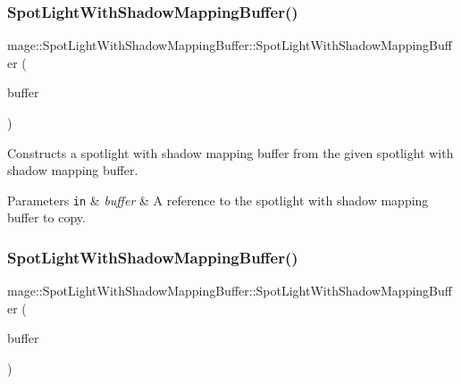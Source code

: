 \subsubsection{\texorpdfstring{Spot\+Light\+With\+Shadow\+Mapping\+Buffer()}{SpotLightWithShadowMappingBuffer()}\hspace{0.1cm}{\footnotesize\ttfamily [2/3]}}
{\footnotesize\ttfamily mage\+::\+Spot\+Light\+With\+Shadow\+Mapping\+Buffer\+::\+Spot\+Light\+With\+Shadow\+Mapping\+Buffer (\begin{DoxyParamCaption}\item[{const \hyperlink{structmage_1_1_spot_light_with_shadow_mapping_buffer}{Spot\+Light\+With\+Shadow\+Mapping\+Buffer} \&}]{buffer }\end{DoxyParamCaption})\hspace{0.3cm}{\ttfamily [default]}}

Constructs a spotlight with shadow mapping buffer from the given spotlight with shadow mapping buffer.


\begin{DoxyParams}[1]{Parameters}
\mbox{\tt in}  & {\em buffer} & A reference to the spotlight with shadow mapping buffer to copy. \\
\hline
\end{DoxyParams}
\hypertarget{structmage_1_1_spot_light_with_shadow_mapping_buffer_a933982cf023e052a21da2009f48d9ae1}{}\label{structmage_1_1_spot_light_with_shadow_mapping_buffer_a933982cf023e052a21da2009f48d9ae1} 
\subsubsection{\texorpdfstring{Spot\+Light\+With\+Shadow\+Mapping\+Buffer()}{SpotLightWithShadowMappingBuffer()}\hspace{0.1cm}{\footnotesize\ttfamily [3/3]}}
{\footnotesize\ttfamily mage\+::\+Spot\+Light\+With\+Shadow\+Mapping\+Buffer\+::\+Spot\+Light\+With\+Shadow\+Mapping\+Buffer (\begin{DoxyParamCaption}\item[{\hyperlink{structmage_1_1_spot_light_with_shadow_mapping_buffer}{Spot\+Light\+With\+Shadow\+Mapping\+Buffer} \&\&}]{buffer }\end{DoxyParamCaption})\hspace{0.3cm}{\ttfamily [default]}}

